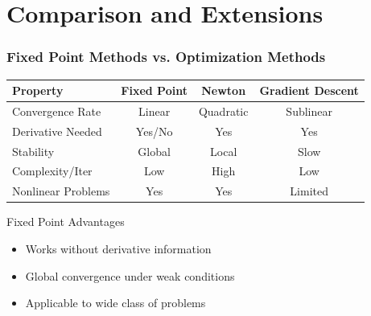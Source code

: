 \documentclass[aspectratio=169,10pt]{beamer}
\begin{document}
\section{Comparison and Extensions}

\begin{frame}
    \frametitle{Fixed Point Methods vs. Optimization Methods}

    \begin{table}
        \centering
        \small
        \begin{tabular}{|l|c|c|c|}
            \hline
            \textbf{Property} & \textbf{Fixed Point} & \textbf{Newton} & \textbf{Gradient Descent} \\
            \hline
            Convergence Rate & Linear & Quadratic & Sublinear \\
            \hline
            Derivative Needed & Yes/No & Yes & Yes \\
            \hline
            Stability & Global & Local & Slow \\
            \hline
            Complexity/Iter & Low & High & Low \\
            \hline
            Nonlinear Problems & Yes & Yes & Limited \\
            \hline
        \end{tabular}
    \end{table}

    \bigskip

    \begin{block}{Fixed Point Advantages}
        \begin{itemize}
            \item Works without derivative information
            \item Global convergence under weak conditions
            \item Applicable to wide class of problems
        \end{itemize}
    \end{block}
\end{frame}
\end{document}
